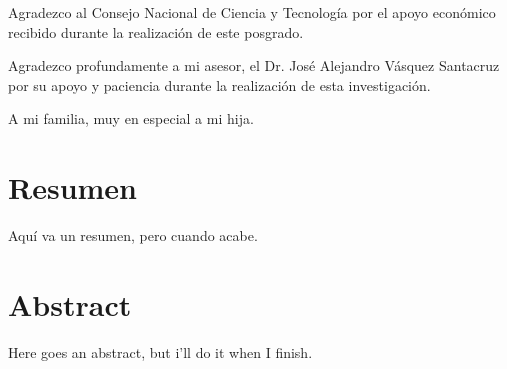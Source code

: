 Agradezco al Consejo Nacional de Ciencia y Tecnología por el apoyo económico recibido durante la realización de este posgrado.

Agradezco profundamente a mi asesor, el Dr. José Alejandro Vásquez Santacruz por su apoyo y paciencia durante la realización de esta investigación.

A mi familia, muy en especial a mi hija. 

\chapter*{Resumen}

Aquí va un resumen, pero cuando acabe.

\chapter*{Abstract}

Here goes an abstract, but i'll do it when I finish.

